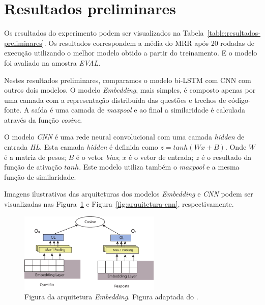 \documentclass[12pt]{article}
\begin{document}
\section{Resultados preliminares}\label{sec:resultados-preliminares}

Os resultados do experimento podem ser visualizados na Tabela~\ref{table:resultados-preliminares}. Os resultados correspondem a média do MRR após 20 rodadas de execução utilizando o melhor modelo obtido a partir do treinamento. E o modelo foi avaliado na amostra \emph{EVAL}. 

Nestes resultados preliminares, comparamos o modelo bi-LSTM com CNN com outros dois modelos. O modelo \emph{Embedding}, mais simples, é composto apenas por uma camada com a representação distribuída das questões e trechos de código-fonte. A saída é uma camada de \textit{maxpool} e ao final a similaridade é calculada através da função \textit{cosine}. 

O modelo \emph{CNN} é uma rede neural convolucional com uma camada \textit{hidden} de entrada \emph{HL}. Esta camada \textit{hidden}  é definida como $z = tanh(Wx +B)$. Onde $W$ é a matriz de pesos; $B$ é o vetor \textit{bias}; $x$ é o vetor de entrada; $z$ é o resultado da função de ativação $tanh$.  Este modelo utiliza também o \textit{maxpool} e a mesma função de similaridade.

Imagens ilustrativas das arquiteturas dos modelos \emph{Embedding} e \emph{CNN} podem ser visualizadas nas Figura~\ref{fig:arquitetura-embedding} e Figura~\ref{fig:arquitetura-cnn}, respectivamente.

\begin{figure}[h]
    \centering
    \includegraphics[width=0.60\textwidth]{figures/ArquiteturaEmbedding.pdf}
    \caption{Figura da arquitetura \emph{Embedding}. Figura adaptada do \cite{tan-lstm-qa}.}
    \label{fig:arquitetura-embedding}
\end{figure}
\end{document}

